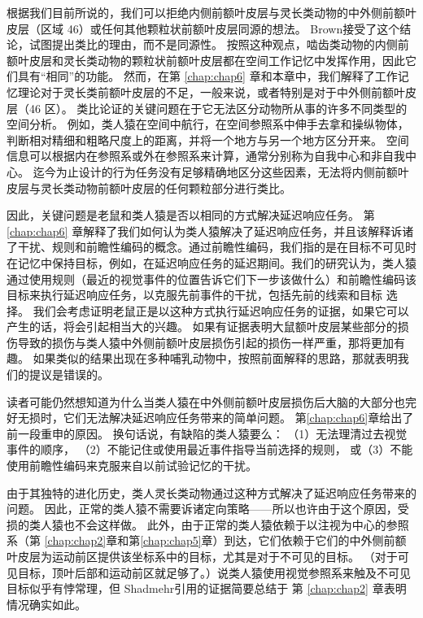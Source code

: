 根据我们目前所说的，我们可以拒绝内侧前额叶皮层与灵长类动物的中外侧前额叶皮层（区域 46）或任何其他颗粒状前额叶皮层同源的想法。
Brown\cite{brown2002rodent}接受了这个结论，试图提出类比的理由，而不是同源性。
按照这种观点，啮齿类动物的内侧前额叶皮层和灵长类动物的颗粒状前额叶皮层都在空间工作记忆中发挥作用，因此它们具有“相同”的功能。
然而，在第 \ref{chap:chap6} 章和本章中，我们解释了工作记忆理论对于灵长类前额叶皮层的不足，一般来说，或者特别是对于中外侧前额叶皮层（46 区）。
类比论证的关键问题在于它无法区分动物所从事的许多不同类型的空间分析。
例如，类人猿在空间中航行，在空间参照系中伸手去拿和操纵物体，判断相对精细和粗略尺度上的距离，并将一个地方与另一个地方区分开来。
空间信息可以根据内在参照系或外在参照系来计算，通常分别称为自我中心和非自我中心。
迄今为止设计的行为任务没有足够精确地区分这些因素，无法将内侧前额叶皮层与灵长类动物前额叶皮层的任何颗粒部分进行类比。
\par


因此，关键问题是老鼠和类人猿是否以相同的方式解决延迟响应任务。
第 \ref{chap:chap6} 章解释了我们如何认为类人猿解决了延迟响应任务，并且该解释诉诸了干扰、规则和前瞻性编码的概念。通过前瞻性编码，我们指的是在目标不可见时在记忆中保持目标，例如，在延迟响应任务的延迟期间。我们的研究认为，类人猿通过使用规则（最近的视觉事件的位置告诉它们下一步该做什么）和前瞻性编码该目标来执行延迟响应任务，以克服先前事件的干扰，包括先前的线索和目标 选择。
我们会考虑证明老鼠正是以这种方式执行延迟响应任务的证据，如果它可以产生的话，将会引起相当大的兴趣。
如果有证据表明大鼠额叶皮层某些部分的损伤导致的损伤与类人猿中外侧前额叶皮层损伤引起的损伤一样严重，那将更加有趣。
如果类似的结果出现在多种哺乳动物中，按照前面解释的思路，那就表明我们的提议是错误的。
\par


读者可能仍然想知道为什么当类人猿在中外侧前额叶皮层损伤后大脑的大部分也完好无损时，它们无法解决延迟响应任务带来的简单问题。
第\ref{chap:chap6}章给出了前一段重申的原因。
换句话说，有缺陷的类人猿要么：
（1）无法理清过去视觉事件的顺序，
（2）不能记住或使用最近事件指导当前选择的规则，
或（3）不能 使用前瞻性编码来克服来自以前试验记忆的干扰。
\par


由于其独特的进化历史，类人灵长类动物通过这种方式解决了延迟响应任务带来的问题。
因此，正常的类人猿不需要诉诸定向策略——所以也许由于这个原因，受损的类人猿也不会这样做。
此外，由于正常的类人猿依赖于以注视为中心的参照系（第 \ref{chap:chap2}章和第\ref{chap:chap5}章）到达，它们依赖于它们的中外侧前额叶皮层为运动前区提供该坐标系中的目标，尤其是对于不可见的目标。
（对于可见目标，顶叶后部和运动前区就足够了。）说类人猿使用视觉参照系来触及不可见目标似乎有悖常理，但 Shadmehr\cite{shadmehr2004computational}引用的证据简要总结于 第 \ref{chap:chap2} 章表明情况确实如此。
\par



